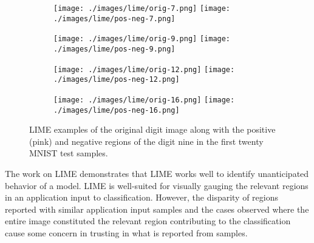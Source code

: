 \begin{figure}[H]
    \centering

    \begin{subfigure}{0.50\columnwidth}
        \centering
        \texttt{[image: ./images/lime/orig-7.png]}
        \texttt{[image: ./images/lime/pos-neg-7.png]}
        \caption{}
        \label{fig:lime_pos_neg_ex7}
    \end{subfigure}%
    \begin{subfigure}{0.50\columnwidth}
        \centering
        \texttt{[image: ./images/lime/orig-9.png]}
        \texttt{[image: ./images/lime/pos-neg-9.png]}
        \caption{}
        \label{fig:lime_pos_neg_ex9}
    \end{subfigure}

    \par\medskip

    \begin{subfigure}{0.50\columnwidth}
        \centering
        \texttt{[image: ./images/lime/orig-12.png]}
        \texttt{[image: ./images/lime/pos-neg-12.png]}
        \caption{}
        \label{fig:lime_pos_neg_ex12}
    \end{subfigure}%
    \begin{subfigure}{0.50\columnwidth}
        \centering
        \texttt{[image: ./images/lime/orig-16.png]}
        \texttt{[image: ./images/lime/pos-neg-16.png]}
        \caption{}
        \label{fig:lime_pos_neg_ex16}
    \end{subfigure}

    \caption{LIME examples of the original digit image along with the positive (pink) and negative regions of the digit nine in the first twenty MNIST test samples.}
    \label{fig:lime_pos_neg_nine_test}
\end{figure}

The work on LIME demonstrates that LIME works well to identify unanticipated
behavior of a model\cite{ribeiro2016should}. LIME is well-suited for visually
gauging the relevant regions in an application input to classification. However,
the disparity of regions reported with similar application input samples and the
cases observed where the entire image constituted the relevant region
contributing to the classification cause some concern in trusting in what is
reported from samples.

